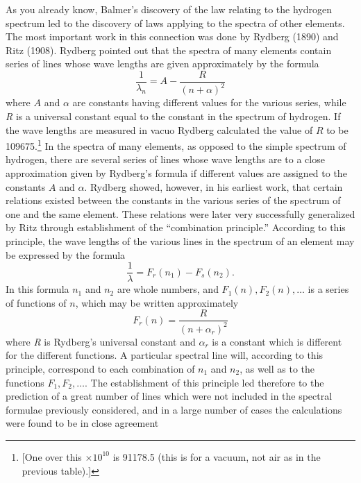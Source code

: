 As you already know, Balmer's discovery of the law relating to the
hydrogen spectrum led to the discovery of laws applying to the spectra
of other elements. The most important work in this connection was done
by Rydberg (1890) and Ritz (1908). Rydberg pointed out that the spectra
of many elements contain series of lines whose wave lengths are given
approximately by the formula
\begin{equation*}
\frac{1}{\lambda_n} = A - \frac{R}{(n + \alpha)^2}
\end{equation*}
where $A$ and $\alpha$ are constants having different values for
the various series, while \emph{R} is a universal constant equal to the
constant in the spectrum of hydrogen. If the wave lengths are measured
in vacuo Rydberg calculated the value of $R$ to be 109675.\footnote{{[}One
  over this $\times 10^{10}$ is 91178.5 (this is for a vacuum,
  not air as in the previous table).{]}} In the spectra of many
elements, as opposed to the simple spectrum of hydrogen, there are
several series of lines whose wave lengths are to a close approximation
given by Rydberg's formula if different values are assigned to the
constants $A$ and $\alpha$. Rydberg showed, however, in his
earliest work, that certain relations existed between the constants in
the various series of the spectrum of one and the same element. These
relations were later very successfully generalized by Ritz through
establishment of the ``combination principle.'' According to this
principle, the wave lengths of the various lines in the spectrum of an
element may be expressed by the formula
%
\begin{equation}\label{eq:bohr_2}
\frac{1}{\lambda} = F_r(n_1) - F_s(n_2) .
\end{equation}
%
In this formula $n_1$ and $n_2$ are whole numbers, and
$F_1(n), F_2(n), \ldots{}$ is a series of
functions of $n$, which may be written approximately
%
\begin{equation*}
F_r(n) = \frac{R}{(n +\alpha_r)^2}
\end{equation*}
%
where \emph{R} is Rydberg's universal constant and $\alpha_r$ is a
constant which is different for the different functions. A particular
spectral line will, according to this principle, correspond to each
combination of $n_1$ and $n_2$, as well as to the functions
$F_1, F_2, \ldots{}$. The establishment of this principle led
therefore to the prediction of a great number of lines which were not
included in the spectral formulae previously considered, and in a large
number of cases the calculations were found to be in close agreement
